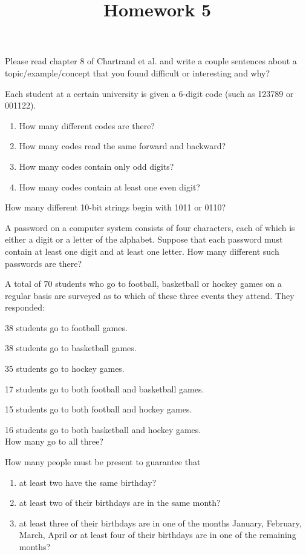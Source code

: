 \documentclass{homework}
\title{Homework 5}
\begin{document}
 \maketitle

\question Please read chapter 8 of Chartrand et al. and write a couple sentences about a topic/example/concept that you found difficult or interesting and why?

\question Each student at a certain university is given a 6-digit code (such as 123789 or 001122).
\begin{enumerate}[label=(\alph*)]
    \item How many different codes are there?
    \item How many codes read the same forward and backward?
    \item How many codes contain only odd digits?
    \item How many codes contain at least one even digit?
\end{enumerate}

\question How many different 10-bit strings begin with 1011 or 0110?

\question A password on a computer system consists of four characters, each of which is either a digit or a letter of the alphabet. Suppose that each password must contain at least one digit and at least one letter. How many different such passwords are there?

\question A total of 70 students who go to football, basketball or hockey games on a regular basis are surveyed as to which of these three events they attend. They responded:

38 students go to football games. \par
38 students go to basketball games. \par
35 students go to hockey games. \par
17 students go to both football and basketball games. \par
15 students go to both football and hockey games. \par
16 students go to both basketball and hockey games. \\
How many go to all three?

\question How many people must be present to guarantee that
\begin{enumerate}[label=(\alph*)]
    \item at least two have the same birthday?
    \item at least two of their birthdays are in the same month?
    \item at least three of their birthdays are in one of the months January, February, March, April or at least four of their birthdays are in one of the remaining months?
\end{enumerate}
\end{document}
